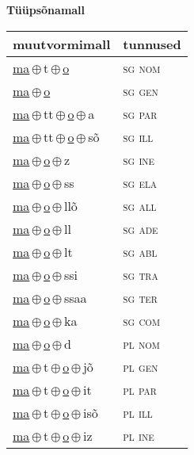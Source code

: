 

\vspace{3.5em}
\noindent \begin{minipage}{\textwidth}
\noindent \textbf{Tüüpsõnamall \,}\\

\begin{sideways}
\begin{tabular}{l l}
muutvormimall & tunnused \\
\hline
\underline{ma}\,$\oplus$\,t\,$\oplus$\,\underline{o} & \textsc{ sg nom } \\
\underline{ma}\,$\oplus$\,\underline{o} & \textsc{ sg gen } \\
\underline{ma}\,$\oplus$\,tt\,$\oplus$\,\underline{o}\,$\oplus$\,a & \textsc{ sg par } \\
\underline{ma}\,$\oplus$\,tt\,$\oplus$\,\underline{o}\,$\oplus$\,sõ & \textsc{ sg ill } \\
\underline{ma}\,$\oplus$\,\underline{o}\,$\oplus$\,z & \textsc{ sg ine } \\
\underline{ma}\,$\oplus$\,\underline{o}\,$\oplus$\,ss & \textsc{ sg ela } \\
\underline{ma}\,$\oplus$\,\underline{o}\,$\oplus$\,llõ & \textsc{ sg all } \\
\underline{ma}\,$\oplus$\,\underline{o}\,$\oplus$\,ll & \textsc{ sg ade } \\
\underline{ma}\,$\oplus$\,\underline{o}\,$\oplus$\,lt & \textsc{ sg abl } \\
\underline{ma}\,$\oplus$\,\underline{o}\,$\oplus$\,ssi & \textsc{ sg tra } \\
\underline{ma}\,$\oplus$\,\underline{o}\,$\oplus$\,ssaa & \textsc{ sg ter } \\
\underline{ma}\,$\oplus$\,\underline{o}\,$\oplus$\,ka & \textsc{ sg com } \\
\underline{ma}\,$\oplus$\,\underline{o}\,$\oplus$\,d & \textsc{ pl nom } \\
\underline{ma}\,$\oplus$\,t\,$\oplus$\,\underline{o}\,$\oplus$\,jõ & \textsc{ pl gen } \\
\underline{ma}\,$\oplus$\,t\,$\oplus$\,\underline{o}\,$\oplus$\,it & \textsc{ pl par } \\
\underline{ma}\,$\oplus$\,t\,$\oplus$\,\underline{o}\,$\oplus$\,isõ & \textsc{ pl ill } \\
\underline{ma}\,$\oplus$\,t\,$\oplus$\,\underline{o}\,$\oplus$\,iz & \textsc{ pl ine } \\

\end{tabular}
\end{sideways}
\end{minipage}
